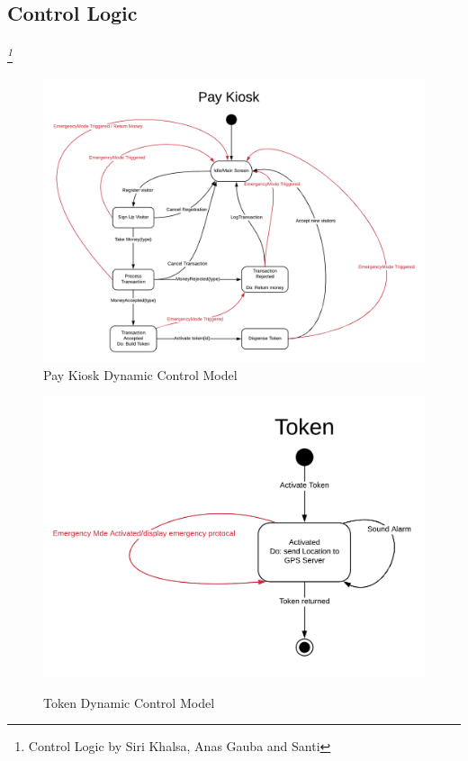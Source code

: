 \documentclass[12pt]{article}
\begin{document}
    \subsection{Control Logic} \label{logic}%
	\paragraph{} \textit{ \footnote{Control Logic by Siri Khalsa, Anas Gauba and Santi}}

    \begin{figure}[H]
 		\centerline{\includegraphics[scale=0.15]{PayKiosk.png}}
 		\caption{Pay Kiosk Dynamic Control Model}
  		\label{fig:normal}
    \end{figure}

    \begin{figure}[H]
 		{\includegraphics[scale=0.15]{Token.png}}
 		\caption{Token Dynamic Control Model}
  		\label{fig:normal}
    \end{figure}
\end{document}
